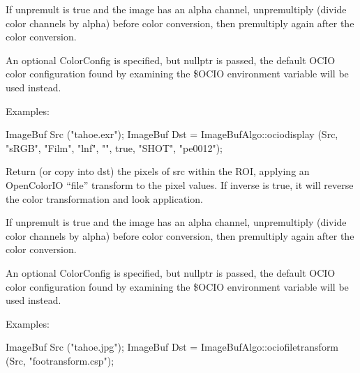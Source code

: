 If {\cf unpremult} is {\cf true} and the image has an alpha channel,
unpremultiply (divide color channels by alpha) before color conversion, then
premultiply again after the color conversion.

An optional {\cf ColorConfig} is specified, but {\cf nullptr} is passed, the
default OCIO color configuration found by examining the {\cf \$OCIO}
environment variable will be used instead.

\smallskip
\noindent Examples:
\begin{code}
    ImageBuf Src ("tahoe.exr");
    ImageBuf Dst = ImageBufAlgo::ociodisplay (Src, "sRGB", "Film", "lnf",
                                              "", true, "SHOT", "pe0012");
\end{code}
\apiend


 
Return (or copy into {\cf dst}) the pixels of {\cf src} within the ROI,
applying an OpenColorIO ``file'' transform to the pixel values. If {\cf inverse} is {\cf
true}, it will reverse the color transformation and look application.

If {\cf unpremult} is {\cf true} and the image has an alpha channel,
unpremultiply (divide color channels by alpha) before color conversion, then
premultiply again after the color conversion.

An optional {\cf ColorConfig} is specified, but {\cf nullptr} is passed, the
default OCIO color configuration found by examining the {\cf \$OCIO}
environment variable will be used instead.

\smallskip
\noindent Examples:
\begin{code}
    ImageBuf Src ("tahoe.jpg");
    ImageBuf Dst = ImageBufAlgo::ociofiletransform (Src, "footransform.csp");
\end{code}
\apiend


